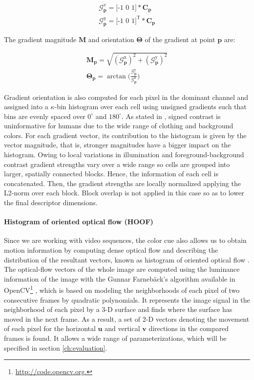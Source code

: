 \documentclass[10pt,twocolumn,letterpaper]{article}
\begin{document}
\begin{gather}
\mathcal{G}_\mathbf{p}^x = \mbox{[-1 0 1]} \ast \mathbf{C}_\mathbf{p} \label{eq:gx} \\[2ex]
\mathcal{G}_\mathbf{p}^y = \mbox{[-1 0 1]}^\mathrm{T} \ast \mathbf{C}_\mathbf{p} \label{eq:gy}
\end{gather}

The gradient magnitude $\mathbf{M}$ and orientation $\mathbf{\Theta}$ of the gradient at point $\mathbf{p}$ are:

\begin{gather}
\mathbf{M}_{\mathbf{p}} = \sqrt{(\mathcal{G}_{\mathbf{p}}^{\mathrm{x}})^2 + (\mathcal{G}_{\mathbf{p}}^{\mathrm{y}})^2} \label{eq:magnitude}\\[2ex]
\mathbf{\Theta}_{\mathbf{p}} = \arctan \Big(\frac{\mathcal{G}_{\mathbf{p}}^{\mathrm{y}}}{\mathcal{G}_{\mathbf{p}}^{\mathrm{x}}}\Big) \label{eq:orientation}
\end{gather}

Gradient orientation is also computed for each pixel in the dominant channel and assigned into a $\kappa$-bin histogram over each cell using unsigned gradients such that bins are evenly spaced over $0^\circ$ and $180^\circ$. As stated in \cite{dalal2005histograms}, signed contrast is uninformative for humans due to the wide range of clothing and background colors. For each gradient vector, its contribution to the histogram is given by the vector magnitude, that is, stronger magnitudes have a bigger impact on the histogram. Owing to local variations in illumination and foreground-background contrast gradient strengths vary over a wide range so cells are grouped into larger, spatially connected blocks. Hence, the information of each cell is concatenated. Then, the gradient strengths are locally normalized applying the L2-norm over each block. Block overlap is not applied in this case so as to lower the final descriptor dimensions. 

\paragraph{Histogram of oriented optical flow (HOOF)} 
Since we are working with video sequences, the color cue also allows us to obtain motion information by computing dense optical flow and describing the distribution of the resultant vectors, known as histogram of oriented optical flow \cite{dalal2006human}. The optical-flow vectors of the whole image are computed using the luminance information of the image with the Gunnar Farneb\"{a}ck's algorithm \cite{farneback2003two} available in OpenCV\footnote{\url{http://code.opencv.org.}} \cite{bradski2008learning}, which is based on modeling the neighborhoods of each pixel of two consecutive frames by quadratic polynomials. It represents the image signal in the neighborhood of each pixel by a 3-D surface and finds where the surface has moved in the next frame. As a result, a set of 2-D vectors denoting the movement of each pixel for the horizontal $\mathbf{u}$ and vertical $\mathbf{v}$ directions in the compared frames is found. It allows a wide range of parameterizations, which will be specified in section \ref{ch:evaluation}.
\end{document}
